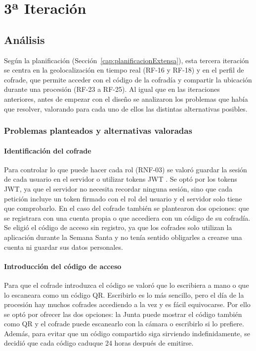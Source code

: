 \section{3ª Iteración}\label{cap:3_iteracion}

\subsection{Análisis}

Según la planificación (Sección~\ref{cap:planificacionExtensa}), esta tercera iteración se centra en la geolocalización en tiempo real (RF-16 y RF-18) y en el perfil de cofrade, que permite acceder con el código de la cofradía y compartir la ubicación durante una procesión (RF-23 a RF-25). Al igual que en las iteraciones anteriores, antes de empezar con el diseño se analizaron los problemas que había que resolver, valorando para cada uno de ellos las distintas alternativas posibles.

\subsubsection{Problemas planteados y alternativas valoradas}

\paragraph{Identificación del cofrade}
Para controlar lo que puede hacer cada rol (RNF-03) se valoró guardar la sesión de cada usuario en el servidor o utilizar tokens JWT \cite{jwt}. Se optó por los tokens JWT, ya que el servidor no necesita recordar ninguna sesión, sino que cada petición incluye un token firmado con el rol del usuario y el servidor solo tiene que comprobarlo. En el caso del cofrade también se plantearon dos opciones: que se registrara con una cuenta propia o que accediera con un código de su cofradía. Se eligió el código de acceso sin registro, ya que los cofrades solo utilizan la aplicación durante la Semana Santa y no tenía sentido obligarles a crearse una cuenta ni guardar sus datos personales.

\paragraph{Introducción del código de acceso}
Para que el cofrade introduzca el código se valoró que lo escribiera a mano o que lo escaneara como un código QR. Escribirlo es lo más sencillo, pero el día de la procesión hay muchos cofrades accediendo a la vez y es fácil equivocarse. Por ello se optó por ofrecer las dos opciones: la Junta puede mostrar el código también como QR y el cofrade puede escanearlo con la cámara o escribirlo si lo prefiere. Además, para evitar que un código compartido siga sirviendo indefinidamente, se decidió que cada código caduque 24 horas después de emitirse.

